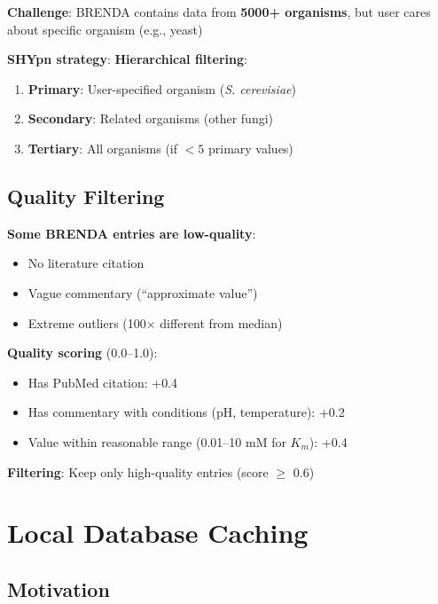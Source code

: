 \textbf{Challenge}: BRENDA contains data from \textbf{5000+ organisms}, but user cares about specific organism (e.g., yeast)

\textbf{SHYpn strategy}: \textbf{Hierarchical filtering}:

\begin{enumerate}
    \item \textbf{Primary}: User-specified organism (\textit{S. cerevisiae})
    \item \textbf{Secondary}: Related organisms (other fungi)
    \item \textbf{Tertiary}: All organisms (if $<5$ primary values)
\end{enumerate}

\subsection{Quality Filtering}
\label{subsec:quality-filtering}

\textbf{Some BRENDA entries are low-quality}:

\begin{itemize}
    \item No literature citation
    \item Vague commentary (``approximate value'')
    \item Extreme outliers (100$\times$ different from median)
\end{itemize}

\textbf{Quality scoring} (0.0--1.0):

\begin{itemize}
    \item Has PubMed citation: +0.4
    \item Has commentary with conditions (pH, temperature): +0.2
    \item Value within reasonable range (0.01--10 mM for $K_m$): +0.4
\end{itemize}

\textbf{Filtering}: Keep only high-quality entries (score $\geq$ 0.6)

\section{Local Database Caching}
\label{sec:local-database-caching}

\subsection{Motivation}
\label{subsec:caching-motivation}

